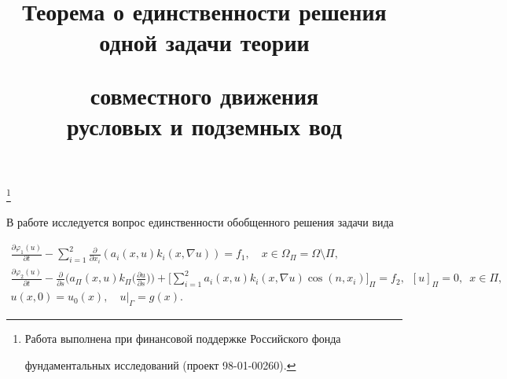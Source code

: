 \title{Теорема о единственности решения одной задачи теории


совместного движения\\ русловых и подземных вод}


\thanks{Работа выполнена при финансовой поддержке Российского фонда


фундаментальных исследований (проект 98-01-00260).}





\date{}




\pagestyle{plain} %







\maketitle


\label{begin}





В работе исследуется вопрос единственности обобщенного решения задачи вида


\begin{gather}


\label{eq1}


\frac{\partial \varphi_{1}(u)}{\partial t}-\sum_{i=1}^{2}


\frac{\partial}{\partial x_{i}} (a_{i}(x,u) k_{i}(x,\nabla u))=


f_{1},\quad x \in \Omega_{ \Pi}=\Omega \setminus \Pi, \\


%


\label{eq2}


\frac{\partial \varphi_{2}(u)}{\partial t} -


\frac{\partial}{\partial s} \bigg (a_{\Pi}(x,u)


k_{\Pi} \bigg (\frac{\partial u}{\partial s} \bigg) \bigg)+


\bigg [ \sum_{i=1}^{2} a_{i}(x,u) k_{i}(x, \nabla u)


\cos(n,x_{i}) \bigg ]_{ \Pi}=f_{2}, 


\ \; [u]_{\Pi}=0,\ \; x \in \Pi, \\


%


\label{eq3}


u (x,0)=u_{0}(x), \quad u |_{ \Gamma}=g(x).


\end{gather}


